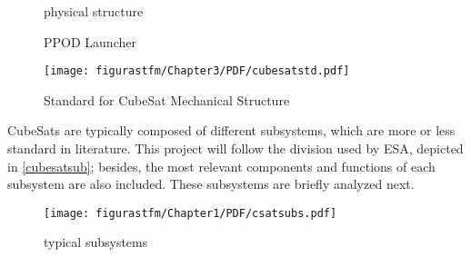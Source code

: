 \newpage
\makeatletter
\setlength\@fptop{0pt}
\setlength{}
\setlength\@fpbot{0pt}
\makeatother
\begin{figure}[t]
			\centering
			 			 \quad

			\caption{ physical structure \cite{nasa}}
\end{figure}

\begin{figure}[H]
			\centering

			\caption{\acrshort{PPOD} Launcher}
\end{figure}

\begin{landscape}
\begin{figure}
			\centering
			\texttt{[image: figurastfm/Chapter3/PDF/cubesatstd.pdf]}
			\caption{Standard for CubeSat Mechanical Structure \cite{calpoly}} \label{cubesatstd}
\end{figure}
\end{landscape}

CubeSats are typically composed of different subsystems, which are more or less standard in literature. This project will follow the division used by \acrshort{ESA}, depicted in \autoref{cubesatsub}; besides, the most relevant components and functions of each subsystem are also included. These subsystems are briefly analyzed next.


\begin{figure}[H]
				\centering
				\texttt{[image: figurastfm/Chapter1/PDF/csatsubs.pdf]}
				\caption{ typical subsystems}
				\label{cubesatsub}
\end{figure}

